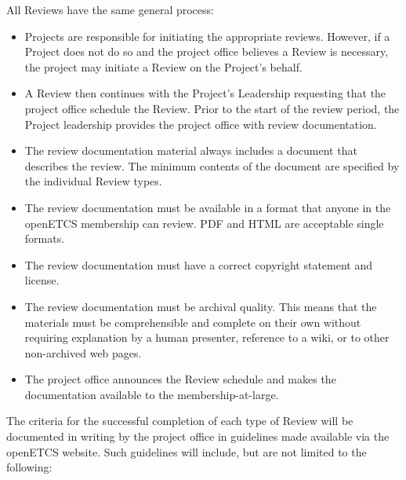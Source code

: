 All Reviews have the same general process:

\begin{itemize}

\item
  Projects are responsible for initiating the appropriate reviews.
  However, if a Project does not do so and the project office believes a
  Review is necessary, the project may initiate a Review on the
  Project's behalf.
\item
  A Review then continues with the Project's Leadership requesting that
  the project office schedule the Review. Prior to the start of the
  review period, the Project leadership provides the project office with
  review documentation.
\item
  The review documentation material always includes a document that
  describes the review. The minimum contents of the document are
  specified by the individual Review types.
\item
  The review documentation must be available in a format that anyone in
  the openETCS membership can review. PDF and HTML are acceptable single
  formats.
\item
  The review documentation must have a correct copyright statement and
  license.
\item
  The review documentation must be archival quality. This means that the
  materials must be comprehensible and complete on their own without
  requiring explanation by a human presenter, reference to a wiki, or to
  other non-archived web pages.
\item
  The project office announces the Review schedule and makes the
  documentation available to the membership-at-large.
\end{itemize}

The criteria for the successful completion of each type of Review will
be documented in writing by the project office in guidelines made
available via the openETCS website. Such guidelines will include, but
are not limited to the following:

